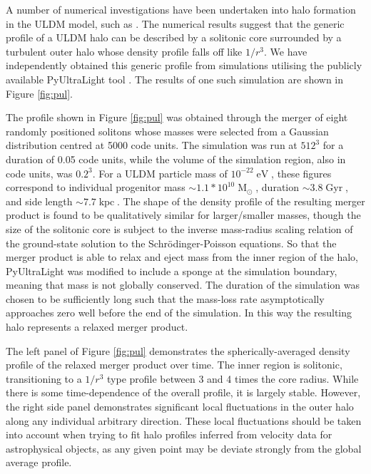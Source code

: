 \documentclass[a4paper,11pt]{article}
\begin{document}
A number of numerical investigations have been undertaken into halo formation in the ULDM model, such as \cite{Schwabe:2016rze, Mocz:2017wlg, Lin:2018whl}. The numerical results suggest that the generic profile of a ULDM halo can be described by a solitonic core surrounded by a turbulent outer halo whose density profile falls off like $1/r^3$. We have independently obtained this generic profile from simulations utilising the publicly available PyUltraLight tool \cite{Edwards:2018ccc}. The results of one such simulation are shown in Figure \ref{fig:pul}. 

The profile shown in Figure \ref{fig:pul} was obtained through the merger of eight randomly positioned solitons whose masses were selected from a Gaussian distribution centred at 5000 code units. The simulation was run at $512^3$ for a duration of 0.05 code units, while the volume of the simulation region, also in code units, was $0.2^3$. For a ULDM particle mass of $10^{-22}\operatorname{eV}$, these figures correspond to individual progenitor mass $\sim 1.1*10^{10}\operatorname{M}_{\odot}$, duration $\sim 3.8 \operatorname{Gyr}$, and side length $\sim 7.7 \operatorname{kpc}$. The shape of the density profile of the resulting merger product is found to be qualitatively similar for larger/smaller masses, though the size of the solitonic core is subject to the inverse mass-radius scaling relation of the ground-state solution to the Schr{\"o}dinger-Poisson equations. So that the merger product is able to relax and eject mass from the inner region of the halo, PyUltraLight was modified to include a sponge at the simulation boundary, meaning that mass is not globally conserved. The duration of the simulation was chosen to be sufficiently long such that the mass-loss rate asymptotically approaches zero well before the end of the simulation. In this way the resulting halo represents a relaxed merger product. 

The left panel of Figure \ref{fig:pul} demonstrates the spherically-averaged density profile of the relaxed merger product over time. The inner region is solitonic, transitioning to a $1/r^3$ type profile between 3 and 4 times the core radius. While there is some time-dependence of the overall profile, it is largely stable. However, the right side panel demonstrates significant local fluctuations in the outer halo along any individual arbitrary direction. These local fluctuations should be taken into account when trying to fit halo profiles inferred from velocity data for astrophysical objects, as any given point may be deviate strongly from the global average profile. 
\end{document}
